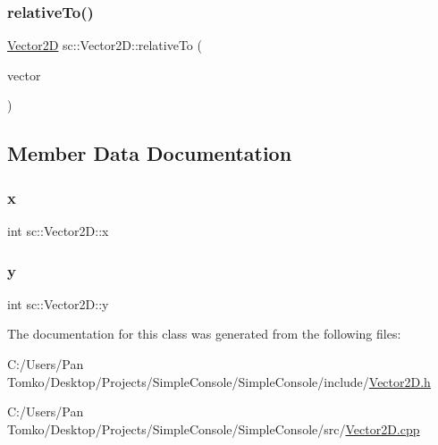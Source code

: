 \subsubsection{\texorpdfstring{relativeTo()}{relativeTo()}}
{\footnotesize\ttfamily \mbox{\hyperlink{classsc_1_1_vector2_d}{Vector2D}} sc\+::\+Vector2\+D\+::relative\+To (\begin{DoxyParamCaption}\item[{const \mbox{\hyperlink{classsc_1_1_vector2_d}{Vector2D}} \&}]{vector }\end{DoxyParamCaption})}



\subsection{Member Data Documentation}
\mbox{\label{classsc_1_1_vector2_d_aa7b06387b89f15a07dfcd5ad401b021e}} 
\subsubsection{\texorpdfstring{x}{x}}
{\footnotesize\ttfamily int sc\+::\+Vector2\+D\+::x}

\mbox{\label{classsc_1_1_vector2_d_ac1c2d0950e1e5903f8032cfb327ca1b1}} 
\subsubsection{\texorpdfstring{y}{y}}
{\footnotesize\ttfamily int sc\+::\+Vector2\+D\+::y}



The documentation for this class was generated from the following files\+:\begin{DoxyCompactItemize}
\item 
C\+:/\+Users/\+Pan Tomko/\+Desktop/\+Projects/\+Simple\+Console/\+Simple\+Console/include/\mbox{\hyperlink{_vector2_d_8h}{Vector2\+D.\+h}}\item 
C\+:/\+Users/\+Pan Tomko/\+Desktop/\+Projects/\+Simple\+Console/\+Simple\+Console/src/\mbox{\hyperlink{_vector2_d_8cpp}{Vector2\+D.\+cpp}}\end{DoxyCompactItemize}

